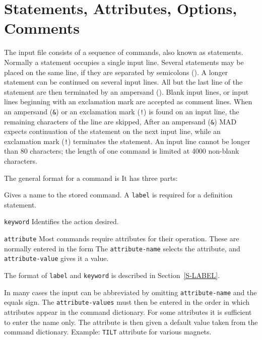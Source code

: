 \section{Statements, Attributes, Options, Comments}
\label{S-STATMT}
The input file consists of a sequence of commands,
also known as statements.
Normally a statement occupies a single input line.
Several statements may be placed on the same line,
if they are separated by semicolons (\ttindex{;}).
A longer statement can be continued on several input lines.
All but the last line of the statement are then terminated
by an ampersand (\ttindex{\&}).
Blank input lines,
or input lines beginning with an exclamation mark are accepted
as comment lines.
When an ampersand ({\tt\&}) or an exclamation mark
({\tt !}) is found
on an input line,
the remaining characters of the line are skipped,
After an ampersand ({\tt\&}) MAD expects continuation of the statement
on the next input line,
while an exclamation mark ({\tt!}) terminates the statement.
An input line cannot be longer than 80 characters;
the length of one command is limited at 4000 non-blank characters.
\par The general format for a command is
It has three parts:
 
\begin{mylist}
Gives a name to the stored command.
A {\tt label} is required for a definition statement.
 
\item[\tt keyword]
Identifies the action desired.
 
\item[\tt attribute]
Most commands require attributes for their operation.
These are normally entered in the form
The {\tt attribute-name} selects the attribute,
and {\tt attribute-value} gives it a value.
\end{mylist}
 
The format of {\tt label} and {\tt keyword}
is described in Section~\ref{S-LABEL}.
 
In many cases the input can be abbreviated by omitting
{\tt attribute-name} and the equals sign.
The {\tt attribute-values} must then be entered in the order
in which attributes appear in the command dictionary.
For some attributes it is sufficient to enter the name only.
The attribute is then given a default value taken from the
command dictionary.
Example: {\tt TILT} attribute for various magnets.
 
